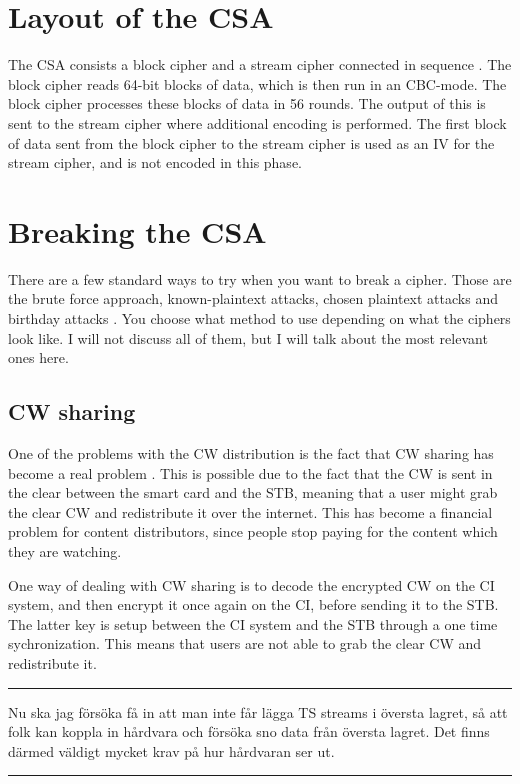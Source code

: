 \section{Layout of the CSA}
The CSA consists a block cipher and a stream cipher connected in sequence 
\citep[p. 271]{WeiLi:2007}. The block cipher reads 64-bit blocks of data, which 
is then run in an CBC-mode. The block cipher processes these blocks of data in 
56 rounds. The output of this is sent to the stream cipher where additional 
encoding is performed. The first block of data sent from the block cipher to the 
stream cipher is used as an IV for the stream cipher, and is not encoded in this 
phase. \citep{DVBAnalysis:2006}

\section{Breaking the CSA}
There are a few standard ways to try when you want to break a cipher. 
Those are the brute force approach, known-plaintext attacks, chosen plaintext 
attacks and birthday attacks \citep[pp. 31-34]{Schneier:2003}. You choose what 
method to use depending on what the ciphers look like. I will not discuss all 
of them, but I will talk about the most relevant ones here.

\subsection{CW sharing}
One of the problems with the CW distribution is the fact that CW sharing has 
become a real problem \citep{Farncombe}. This is possible due to the fact that
the CW is sent in the clear between the smart card and the STB, meaning that a 
user might grab the clear CW and redistribute it over the internet. 
This has become a financial problem for content distributors, since people stop 
paying for the content which they are watching.

One way of dealing with CW sharing is to decode the encrypted CW on the CI 
system, and then encrypt it once again on the CI, before sending it to the STB. 
The latter key is setup between the CI system and the STB  through a one time
sychronization. This means that users are not able to grab the clear CW and 
redistribute it. \citep[pp. 12--13]{HIS:2011}

\hrulefill
\hrule
Nu ska jag försöka få in att man inte får lägga TS streams i översta lagret, så 
att folk kan koppla in hårdvara och försöka sno data från översta lagret. Det 
finns därmed väldigt mycket krav på hur hårdvaran ser ut.
\hrulefill
\hrule

